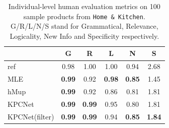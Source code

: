 \begin{table}[bp]
  \small
  \centering
  \begin{tabular}{l|ccccc}
  \hline
  {} & G & R & L & N & S \\
  \hline
  ref  &        0.98 &        1.00 &    1.00 &     0.94 &     2.68 \\
  \hline
  MLE  &        \textbf{0.99} &     0.92 &    \textbf{0.98} &     \textbf{0.85} &     1.45 \\
  hMup &        \textbf{0.99} &     0.92 &    0.86 &     0.81 &     1.81 \\
  KPCNet &        \textbf{0.99} &     \textbf{0.99} &    0.95 &     0.80 &     1.81 \\
  KPCNet(filter) &        \textbf{0.99} &     \textbf{0.99} &    0.94 &     \textbf{0.85} &     \textbf{1.84} \\
  \hline
  \end{tabular}
  \caption{\label{tab:ind-human-eval} Individual-level human evaluation metrics on 100 sample products from \texttt{Home \& Kitchen}. G/R/L/N/S stand for Grammatical, Relevance, Logicality, New Info and Specificity respectively.}
\end{table}


